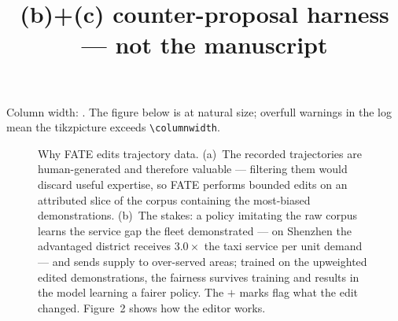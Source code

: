 \documentclass[sigconf,review,anonymous]{acmart}
\begin{document}
\title{(b)+(c) counter-proposal harness --- not the manuscript}
\maketitle

\noindent Column width: \the\columnwidth. The figure below is at natural
size; overfull warnings in the log mean the tikzpicture exceeds
\verb|\columnwidth|.

\begin{figure}[h]
  \centering
  
  \caption{Why FATE edits trajectory data. (a)~The recorded trajectories
  are human-generated and therefore valuable --- filtering them would
  discard useful expertise, so FATE performs bounded edits on an
  attributed slice of the corpus containing the most-biased
  demonstrations. (b)~The stakes: a policy imitating the raw corpus
  learns the service gap the fleet demonstrated --- on Shenzhen the
  advantaged district receives $3.0\times$ the taxi service per unit
  demand --- and sends supply to over-served areas; trained on the
  upweighted edited demonstrations, the fairness survives training and
  results in the model learning a fairer policy. The $+$ marks flag what
  the edit changed. Figure~2 shows how the editor works.}
\end{figure}
\end{document}
